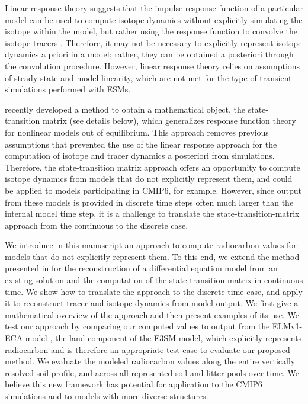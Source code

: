 \documentclass[draft]{agujournal2019}
\begin{document}
Linear response theory suggests that the impulse response function of a particular model can be used to compute isotope dynamics without explicitly simulating the isotope within the model, but rather using the response function to convolve the isotope tracers \cite{Thompson1999}. Therefore, it may not be necessary to explicitly represent isotope dynamics a priori in a model; rather, they can be obtained a posteriori through the convolution procedure. However, linear response theory relies on assumptions of steady-state and model linearity, which are not met for the type of transient simulations performed with ESMs. 

 recently developed a method to obtain a mathematical object, the state-transition matrix (see details below), which generalizes response function theory for nonlinear models out of equilibrium. This approach removes previous assumptions that prevented the use of the linear response approach for the computation of isotope and tracer dynamics a posteriori from simulations. Therefore, the state-transition matrix approach offers an opportunity to compute isotope dynamics from models that do not explicitly represent them, and could be applied to models participating in CMIP6, for example. However, since output from these models is provided in discrete time steps often much larger than the internal model time step, it is a challenge to translate the state-transition-matrix approach from the continuous to the discrete case.

We introduce in this manuscript an approach to compute radiocarbon values for models that do not explicitly represent them. To this end, we extend the method presented in  for the reconstruction of a differential equation model from an existing solution and the computation of the state-transition matrix in continuous time. We show how to translate the approach to the discrete-time case, and apply it to reconstruct tracer and isotope dynamics from model output. We first give a mathematical overview of the approach and then present examples of its use. We test our approach by comparing our computed values to output from the ELMv1-ECA model \cite{Zhu2019, Riley2018,Chen2009JGR, Tang2018EI}, the land component of the E3SM model, which explicitly represents radiocarbon and is therefore an appropriate test case to evaluate our proposed method. We evaluate the modeled radiocarbon values along the entire vertically resolved soil profile, and across all represented soil and litter pools over time. We believe this new framework has  potential for application to the CMIP6 simulations and to models with more diverse structures.
\end{document}
